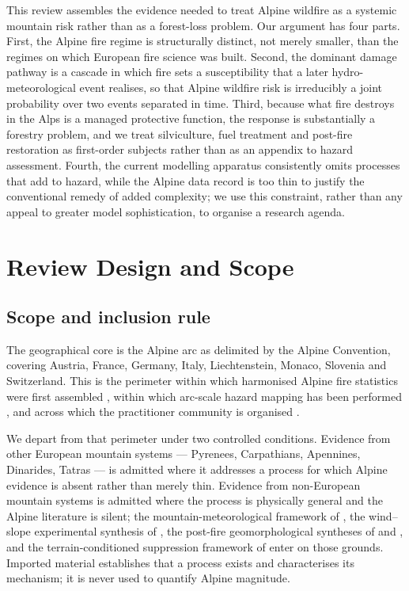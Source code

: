 \documentclass[11pt,a4paper]{article}
\begin{document}
This review assembles the evidence needed to treat Alpine wildfire as a systemic mountain risk rather than as a forest-loss problem. Our argument has four parts. First, the Alpine fire regime is structurally distinct, not merely smaller, than the regimes on which European fire science was built. Second, the dominant damage pathway is a cascade in which fire sets a susceptibility that a later hydro-meteorological event realises, so that Alpine wildfire risk is irreducibly a joint probability over two events separated in time. Third, because what fire destroys in the Alps is a managed protective function, the response is substantially a forestry problem, and we treat silviculture, fuel treatment and post-fire restoration as first-order subjects rather than as an appendix to hazard assessment. Fourth, the current modelling apparatus consistently omits processes that add to hazard, while the Alpine data record is too thin to justify the conventional remedy of added complexity; we use this constraint, rather than any appeal to greater model sophistication, to organise a research agenda.


\section{Review Design and Scope}

\subsection{Scope and inclusion rule}

The geographical core is the Alpine arc as delimited by the Alpine Convention, covering Austria, France, Germany, Italy, Liechtenstein, Monaco, Slovenia and Switzerland. This is the perimeter within which harmonised Alpine fire statistics were first assembled \citep{valese_wildfires_2011, muller_forest_2020}, within which arc-scale hazard mapping has been performed \citep{gerberding_mapping_2025}, and across which the practitioner community is organised \citep{hoang_stakeholders_2026}.

We depart from that perimeter under two controlled conditions. Evidence from other European mountain systems --- Pyrenees, Carpathians, Apennines, Dinarides, Tatras --- is admitted where it addresses a process for which Alpine evidence is absent rather than merely thin. Evidence from non-European mountain systems is admitted where the process is physically general and the Alpine literature is silent; the mountain-meteorological framework of \citet{sharples_overview_2009}, the wind--slope experimental synthesis of \citet{hayajneh_wind_2026}, the post-fire geomorphological syntheses of \citet{santi_wildfire_2022} and \citet{morell_sediment_2021}, and the terrain-conditioned suppression framework of \citet{cardil_assessing_2025} enter on those grounds. Imported material establishes that a process exists and characterises its mechanism; it is never used to quantify Alpine magnitude.
\end{document}
